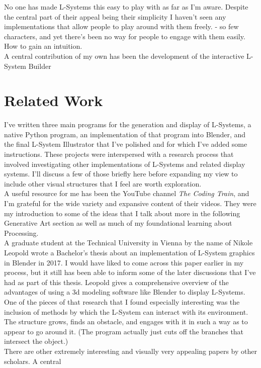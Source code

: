 \documentclass[12pt,twoside]{reedthesis}
\begin{document}
	No one has made L-Systems this easy to play with as far as I'm aware. Despite the central part of their appeal being their simplicity I haven't seen any implementations that allow people to play around with them freely. - so few characters, and yet there's been no way for people to engage with them easily. How to gain an intuition.\\
	
	A central contribution of my own has been the development of the interactive L-System Builder
	
	

\section{Related Work}
	I've written three main programs for the generation and display of L-Systems, a native Python program, an implementation of that program into Blender, and the final L-System Illustrator that I've polished and for which I've added some instructions. These projects were interspersed with a research process that involved investigating other implementations of L-Systems and related display systems. I'll discuss a few of those briefly here before expanding my view to include other visual structures that I feel are worth exploration.\\
	A useful resource for me has been the YouTube channel \textit{The Coding Train}, and I'm grateful for the wide variety and expansive content of their videos. They were my introduction to some of the ideas that I talk about more in the following Generative Art section as well as much of my foundational learning about Processing.\\
	A graduate student at the Technical University in Vienna by the name of Nikole Leopold wrote a Bachelor's thesis about an implementation of L-System graphics in Blender in 2017. I would have liked to come across this paper earlier in my process, but it still has been able to inform some of the later discussions that I've had as part of this thesis. Leopold gives a comprehensive overview of the advantages of using a 3d modeling software like Blender to display L-Systems. One of the pieces of that research that I found especially interesting was the inclusion of methods by which the L-System can interact with its environment. The structure grows, finds an obstacle, and engages with it in such a way as to appear to go around it. (The program actually just cuts off the branches that intersect the object.)\\
	There are other extremely interesting and visually very appealing papers by other scholars. A central\\
\end{document}
